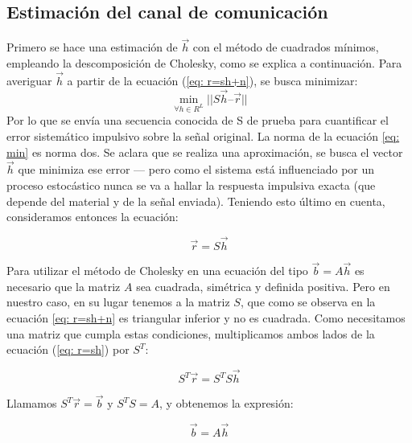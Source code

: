 \subsection{Estimaci\'on del canal de comunicaci\'on}

Primero se hace una estimaci\'on de $\vec{h}$ con el m\'etodo de cuadrados m\'inimos, empleando la descomposici\'on de Cholesky, como se explica a continuaci\'on.  Para averiguar $\vec{h}$ a partir de la ecuaci\'on (\ref{eq: r=sh+n}), se busca minimizar:
\begin{equation}
\min_{\forall h \in R^L}  || S \vec{h} – \vec{r}  ||
\label{eq: min}
\end{equation}
Por lo que se env\'ia una secuencia conocida de S de prueba para cuantificar el error sistem\'atico impulsivo sobre la se\~nal original. La norma de la ecuaci\'on \ref{eq: min} es norma dos. Se aclara que se realiza una aproximaci\'on, se busca el vector $\vec{h}$ que minimiza ese error — pero como el sistema est\'a influenciado por un proceso estoc\'astico nunca se va a hallar la respuesta impulsiva exacta (que depende del material y de la se\~nal enviada).
Teniendo esto \'ultimo en cuenta, consideramos entonces la ecuaci\'on:



\begin{equation} 
\vec{r} = S \vec{h}
\label{eq: r=sh} 
\end{equation} 

Para utilizar el m\'etodo de Cholesky en una ecuaci\'on del tipo $\vec{b} = A \vec{h}$ es necesario que la matriz $A$ sea cuadrada, sim\'etrica y definida positiva. Pero en nuestro caso,  en su lugar tenemos a la matriz $S$, que como se observa en la ecuación \ref{eq: r=sh+n} es triangular inferior y no es cuadrada. Como necesitamos una matriz que cumpla estas condiciones, multiplicamos ambos lados de la ecuaci\'on (\ref{eq: r=sh}) por $S^T$:

\begin{equation} 
S^T \vec{r} = S^T S \vec{h} 
\end{equation} 

Llamamos  $S^T \vec{r} = \vec{b}$ y  $S^T S = A$, y obtenemos la expresi\'on:

\begin{equation} 
\vec{b} = A \vec{h} 
\label{eq: b=Ah} 
\end{equation} 


